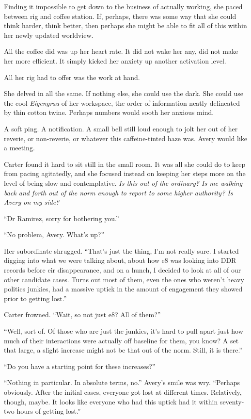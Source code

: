 Finding it impossible to get down to the business of actually working, she paced between rig and coffee station. If, perhaps, there was some way that she could think harder, think better, then perhaps she might be able to fit all of this within her newly updated worldview.

All the coffee did was up her heart rate. It did not wake her any, did not make her more efficient. It simply kicked her anxiety up another activation level.

All her rig had to offer was the work at hand.

She delved in all the same. If nothing else, she could use the dark. She could use the cool \emph{Eigengrau} of her workspace, the order of information neatly delineated by thin cotton twine. Perhaps numbers would sooth her anxious mind.

A soft ping. A notification. A small bell still loud enough to jolt her out of her reverie, or non-reverie, or whatever this caffeine-tinted haze was. Avery would like a meeting.

Carter found it hard to sit still in the small room. It was all she could do to keep from pacing agitatedly, and she focused instead on keeping her steps more on the level of being slow and contemplative. \emph{Is this out of the ordinary? Is me walking back and forth out of the norm enough to report to some higher authority? Is Avery on my side?}

``Dr Ramirez, sorry for bothering you.''

``No problem, Avery. What's up?''

Her subordinate shrugged. ``That's just the thing, I'm not really sure. I started digging into what we were talking about, about how e8 was looking into DDR records before eir disappearance, and on a hunch, I decided to look at all of our other candidate cases. Turns out most of them, even the ones who weren't heavy politics junkies, had a massive uptick in the amount of engagement they showed prior to getting lost.''

Carter frowned. ``Wait, so not just e8? All of them?''

``Well, sort of. Of those who are just the junkies, it's hard to pull apart just how much of their interactions were actually off baseline for them, you know? A set that large, a slight increase might not be that out of the norm. Still, it is there.''

``Do you have a starting point for these increases?''

``Nothing in particular. In absolute terms, no.'' Avery's smile was wry. ``Perhaps obviously. After the initial cases, everyone got lost at different times. Relatively, though, maybe. It looks like everyone who had this uptick had it within seventy-two hours of getting lost.''

